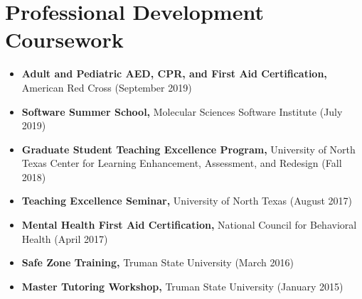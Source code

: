 \documentclass[letterpaper,11pt]{article}
\newcommand{\resumeItem}[2]{
  \item\small{
    \textbf{#1}{ #2 \vspace{-2pt}}
  }
}
\newcommand{\resumeSubItem}[2]{\resumeItem{#1}{#2}\vspace{-4pt}}
\newcommand{\resumeSubHeadingListStart}{\begin{itemize}[leftmargin=*]}
\newcommand{\resumeSubHeadingListEnd}{\end{itemize}}
\begin{document}
\section{Professional Development Coursework}
  \resumeSubHeadingListStart
    \resumeSubItem{Adult and Pediatric AED, CPR, and First Aid Certification\textnormal{,}}
      {American Red Cross (September 2019)}
    \resumeSubItem{Software Summer School\textnormal{,}}
      {Molecular Sciences Software Institute (July 2019)}
    \resumeSubItem{Graduate Student Teaching Excellence Program\textnormal{,}}
      {University of North Texas Center for Learning Enhancement, Assessment, and Redesign (Fall 2018)}  
    \resumeSubItem{Teaching Excellence Seminar\textnormal{,}}
      {University of North Texas (August 2017)}
    \resumeSubItem{Mental Health First Aid Certification\textnormal{,}}
      {National Council for Behavioral Health (April 2017)}
    \resumeSubItem{Safe Zone Training\textnormal{,}}
      {Truman State University (March 2016)}
    \resumeSubItem{Master Tutoring Workshop\textnormal{,}}
      {Truman State University (January 2015)}
  \resumeSubHeadingListEnd
\end{document}
